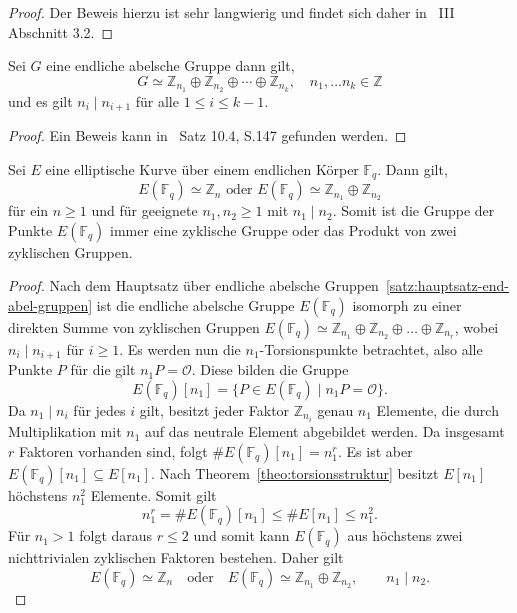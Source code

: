 \begin{proof}
    Der Beweis hierzu ist sehr langwierig und findet sich daher in~\cite{washington08} III Abschnitt 3.2.
\end{proof}
\begin{satz}\label{satz:hauptsatz-end-abel-gruppen}
    Sei $G$ eine endliche abelsche Gruppe dann gilt,
    \[
        G\simeq \mathbb{Z}_{n_1}\oplus \mathbb{Z}_{n_2}\oplus\cdots\oplus\mathbb{Z}_{n_k},\quad n_1,\dots n_k\in\mathbb{Z}
    \]
    und es gilt $n_i\mid n_{i+1}$ für alle $1\leq i\leq k-1$.
\end{satz}
\begin{proof}
    Ein Beweis kann in~\cite{karpf24} Satz 10.4, S.147 gefunden werden.
\end{proof}

\begin{theorem}\label{theo:prod-zyklischer-gruppen}
    Sei $E$ eine elliptische Kurve über einem endlichen Körper $\mathbb{F}_q$. Dann gilt,
    \[
        E(\mathbb{F}_q) \simeq \mathbb{Z}_n \text {  oder  }  E(\mathbb{F}_q) \simeq\mathbb{Z}_{n_1} \oplus \mathbb{Z}_{n_2}
    \]
    für ein $n \geq 1$ und für geeignete $n_1,n_2\geq1$ mit $n_1\mid n_2$. Somit ist die Gruppe der Punkte $E(\mathbb{F}_q)$ immer eine zyklische Gruppe oder das Produkt von zwei zyklischen Gruppen.
\end{theorem}

\begin{proof}
    Nach dem Hauptsatz über endliche abelsche Gruppen~\ref{satz:hauptsatz-end-abel-gruppen} ist die endliche abelsche Gruppe $E(\mathbb{F}_q)$ isomorph zu einer direkten Summe von zyklischen Gruppen
    \(E(\mathbb{F}_q)\simeq\mathbb{Z}_{n_1}\oplus \mathbb{Z}_{n_2}\oplus \dots\oplus\mathbb{Z}_{n_r}\), wobei $n_i\mid n_{i+1}$ für $i\geq 1$. Es werden nun die $n_1$-Torsionspunkte betrachtet, also alle Punkte $P$ für die gilt \(n_1P=\mathcal{O}\). Diese bilden die Gruppe
    \[
        E(\mathbb{F}_q)[n_1]
        =
        \{P\in E(\mathbb{F}_q)\mid n_1P=\mathcal{O}\}.
    \]
    Da $n_1\mid n_i$ für jedes $i$ gilt, besitzt jeder Faktor
    $\mathbb{Z}_{n_i}$ genau $n_1$ Elemente, die durch Multiplikation
    mit $n_1$ auf das neutrale Element abgebildet werden.  Da insgesamt $r$ Faktoren vorhanden sind, folgt \(\#E(\mathbb{F}_q)[n_1]=n_1^r \).
    Es ist aber \(E(\mathbb{F}_q)[n_1]\subseteq E[n_1]\). Nach Theorem~\ref{theo:torsionsstruktur} besitzt $E[n_1]$ höchstens $n_1^2$ Elemente. Somit gilt
    \[
        n_1^r
        =
        \#E(\mathbb{F}_q)[n_1]
        \leq
        \#E[n_1]
        \leq
        n_1^2.
    \]
    Für $n_1>1$ folgt daraus \( r\leq 2\) und somit kann $E(\mathbb{F}_q)$ aus höchstens zwei nichttrivialen zyklischen Faktoren bestehen. Daher gilt
    \[
        E(\mathbb{F}_q)\simeq\mathbb{Z}_n \quad\text{oder}\quad E(\mathbb{F}_q)
        \simeq
        \mathbb{Z}_{n_1}\oplus\mathbb{Z}_{n_2},
        \qquad n_1\mid n_2.
    \]
\end{proof}

